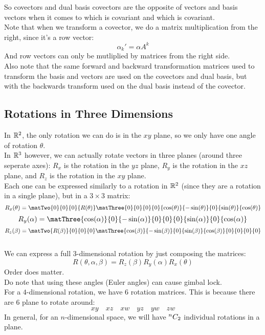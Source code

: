 \documentclass[12pt]{article}
\begin{document}
So covectors and dual basis covectors
are the opposite of vectors and basis vectors
when it comes to which is covariant and
which is covariant. \\

Note that when we transform a covector,
we do a matrix multiplication from
the right, since it's a row vector:
\[ \alpha_k' = \alpha A^k \]
And row vectors can only be mutliplied
by matrices from the right side. \\

Also note that the same forward and backward
transformation matrices used to transform
the basis and vectors are used 
on the covectors and dual basis,
but with the backwards transform used
on the dual basis instead of the covector. \\

\newpage

\subsection*{Rotations in Three Dimensions}

In $\mathbb{R}^2$,
the only rotation we can do is in the $xy$ plane,
so we only have one angle of rotation $\theta$. \\

In $\mathbb{R}^3$ however,
we can actually rotate vectors in three planes
(around three seperate axes):
$R_x$ is the rotation in the $yz$ plane,
$R_y$ is the rotation in the $xz$ plane,
and $R_z$ is the rotation in the $xy$ plane. \\

Each one can be expressed similarly to 
a rotation in $\mathbb{R}^2$ (since they are a rotation
in a single plane), but in a $3\times 3$ matrix:
\[ R_x(\theta) = \matTwo{0}{0}{0}{R(\theta)}
\matThree{0}{0}{0}{0}{\cos(\theta)}
{-\sin(\theta)}{0}{\sin(\theta)}{\cos(\theta)} \]
\[ R_y(\alpha) =
\matThree{\cos(\alpha)}{0}{-\sin(\alpha)}{0}{0}
{0}{\sin(\alpha)}{0}{\cos(\alpha)} \]
\[ R_z(\beta) = \matTwo{R(\beta)}{0}{0}{0}
\matThree{\cos(\beta)}{-\sin(\beta)}{0}
{\sin(\beta)}{\cos(\beta)}
{0}{0}{0}{0} \] \\

We can express a full $3$-dimensional rotation
by just composing the matrices:
\[ R(\theta, \alpha, \beta) = 
R_z(\beta)R_y(\alpha)R_x(\theta) \]
Order does matter. \\
Do note that using these angles 
(Euler angles) can cause gimbal lock. \\

For a $4$-dimensional rotation, we have $6$
rotation matrices. 
This is because there are $6$ plane to rotate
around:
\[ xy \quad xz \quad xw \quad
yz \quad yw \quad zw \] 
In general, for an $n$-dimensional space,
we will have ${}^{n}C_{2}$ individual
rotations in a plane. \\
\end{document}
